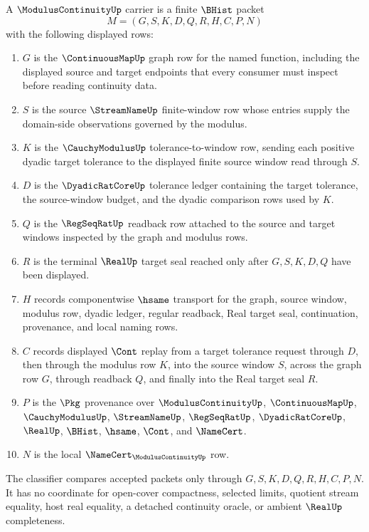 \begin{definition}
\label{def:modulus-continuity-carrier}
A $\ModulusContinuityUp$ carrier is a finite $\BHist$ packet
$$
M=(G,S,K,D,Q,R,H,C,P,N)
$$
with the following displayed rows:
\begin{enumerate}
\item $G$ is the $\ContinuousMapUp$ graph row for the named function, including the displayed source and target endpoints that every consumer must inspect before reading continuity data.
\item $S$ is the source $\StreamNameUp$ finite-window row whose entries supply the domain-side observations governed by the modulus.
\item $K$ is the $\CauchyModulusUp$ tolerance-to-window row, sending each positive dyadic target tolerance to the displayed finite source window read through $S$.
\item $D$ is the $\DyadicRatCoreUp$ tolerance ledger containing the target tolerance, the source-window budget, and the dyadic comparison rows used by $K$.
\item $Q$ is the $\RegSeqRatUp$ readback row attached to the source and target windows inspected by the graph and modulus rows.
\item $R$ is the terminal $\RealUp$ target seal reached only after $G,S,K,D,Q$ have been displayed.
\item $H$ records componentwise $\hsame$ transport for the graph, source window, modulus row, dyadic ledger, regular readback, Real target seal, continuation, provenance, and local naming rows.
\item $C$ records displayed $\Cont$ replay from a target tolerance request through $D$, then through the modulus row $K$, into the source window $S$, across the graph row $G$, through readback $Q$, and finally into the Real target seal $R$.
\item $P$ is the $\Pkg$ provenance over $\ModulusContinuityUp$, $\ContinuousMapUp$, $\CauchyModulusUp$, $\StreamNameUp$, $\RegSeqRatUp$, $\DyadicRatCoreUp$, $\RealUp$, $\BHist$, $\hsame$, $\Cont$, and $\NameCert$.
\item $N$ is the local $\NameCert_{\ModulusContinuityUp}$ row.
\end{enumerate}
The classifier compares accepted packets only through $G,S,K,D,Q,R,H,C,P,N$. It has no coordinate for open-cover compactness, selected limits, quotient stream equality, host real equality, a detached continuity oracle, or ambient $\RealUp$ completeness.
\end{definition}

